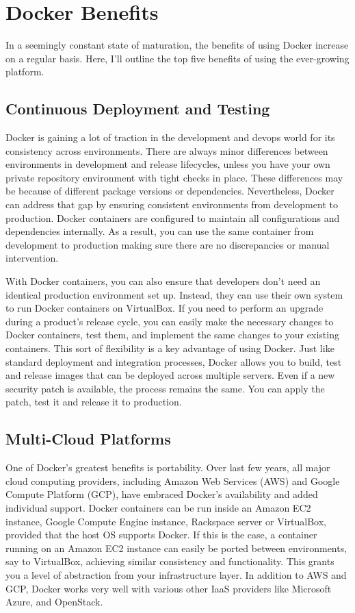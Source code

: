 \documentclass[sigconf]{acmart}
\begin{document}
	\section{Docker Benefits}
	In a seemingly constant state of maturation, the benefits of using Docker increase on a regular basis. Here, I'll outline the top five benefits of using the ever-growing platform. \cite{Docker_Benefits}
	\subsection{Continuous Deployment and Testing}
	Docker is gaining a lot of traction in the development and devops world for its consistency across environments. There are always minor differences between environments in development and release lifecycles, unless you have your own private repository environment with tight checks in place. These differences may be because of different package versions or dependencies. Nevertheless, Docker can address that gap by ensuring consistent environments from development to production. Docker containers are configured to maintain all configurations and dependencies internally. As a result, you can use the same container from development to production making sure there are no discrepancies or manual intervention.
	
	With Docker containers, you can also ensure that developers don't need an identical production environment set up. Instead, they can use their own system to run Docker containers on VirtualBox. If you need to perform an upgrade during a product's release cycle, you can easily make the necessary changes to Docker containers, test them, and implement the same changes to your existing containers. This sort of flexibility is a key advantage of using Docker. Just like standard deployment and integration processes, Docker allows you to build, test and release images that can be deployed across multiple servers. Even if a new security patch is available, the process remains the same. You can apply the patch, test it and release it to production.
	\subsection{Multi-Cloud Platforms}
	One of Docker's greatest benefits is portability. Over last few years, all major cloud computing providers, including Amazon Web Services (AWS) and Google Compute Platform (GCP), have embraced Docker's availability and added individual support. Docker containers can be run inside an Amazon EC2 instance, Google Compute Engine instance, Rackspace server or VirtualBox, provided that the host OS supports Docker. If this is the case, a container running on an Amazon EC2 instance can easily be ported between environments, say to VirtualBox, achieving similar consistency and functionality. This grants you a level of abstraction from your infrastructure layer. In addition to AWS and GCP, Docker works very well with various other IaaS providers like Microsoft Azure, and OpenStack. \cite{Multi_Cloud_Platform}
\end{document}
